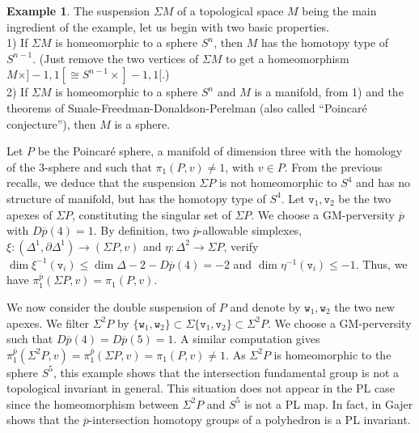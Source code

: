 \documentclass[a4paper,10pt,english,reqno]{amsart}
\theoremstyle{plain}
\theoremstyle{definition}
\newtheorem{example}[proposition]{Example}
\theoremstyle{remark}
\numberwithin{equation}{section}
\def\ov{\overline}
\def\tv{{\mathtt v}}
\def\tw{{\mathtt w}}
\renewcommand\1{\hbox{\ding{192}}}
\renewcommand\2{\hbox{\ding{193}}}
\newcommand\3{\hbox{\ding{194}}}
\newcommand\4{\hbox{\ding{195}}}
\begin{document}
\begin{example}\label{ex:poincaresphere}
 The suspension $\Sigma M$ of a topological space $M$ being the main ingredient of the example, let us begin with
 two basic properties.\\
 1) If $\Sigma M$ is homeomorphic to a sphere $S^n$, then $M$ has the homotopy type of
 $S^{n-1}$. (Just remove the two vertices of $\Sigma M$ to get a homeomorphism
 $M\times ]-1,1[\cong S^{n-1}\times ]-1,1[$.)\\
 2) If $\Sigma M$ is homeomorphic to a sphere $S^n$ and $M$ is a manifold, 
 from 1) and the theorems of 
 Smale-Freedman-Donaldson-Perelman (also called ``Poincar\'e conjecture''), then $M$ is a sphere.
 
Let $P$ be the Poincar\'e sphere, a manifold of dimension three with the homology of the 3-sphere and such that 
$\pi_{1}(P,v)\neq 1$, with $v\in P$.
From the previous recalls, we deduce that the suspension $\Sigma P$ is not homeomorphic to $S^4$
and has  no structure of manifold,  but
has the homotopy type of $S^4$.
Let  $\tv_{1},\tv_{2}$ be  the two apexes of  $\Sigma P$, constituting the singular set of $\Sigma P$.
We choose a GM-perversity $\ov{p}$ with $D\ov{p}(4)=1 $. 
By definition,  two $\ov{p}$-allowable simplexes,
$\xi\colon (\Delta^1,\partial \Delta^1)\to (\Sigma P,v)$ and $\eta\colon \Delta^2\to \Sigma P$,
  verify
$\dim\xi^{-1}(\tv_{i})\leq \dim \Delta-2-D\ov{p}(4)=-2$
and $\dim\eta^{-1}(\tv_{i})\leq -1$. Thus, we have $\pi_{1}^{\ov{p}}(\Sigma P,v)=\pi_{1}(P,v)$.

We now consider the double suspension  of $P$ and denote by $\tw_{1},\tw_{2}$ the two new apexes.
We filter $\Sigma^2 P$ by 
%
$\{\tw_{1},\tw_{2}\}\subset \Sigma\{\tv_{1}, \tv_{2}\}\subset \Sigma^2 P$.
%
%
We choose a GM-perversity such that  $D\ov{p}(4)= D\ov{p}(5)=1$. 
A similar computation gives $\pi_{1}^{\ov{p}}(\Sigma^2 P,v)=\pi_{1}^{\ov{p}}(\Sigma P,v)=\pi_{1}(P,v)\neq 1$.
As $\Sigma^2 P$ is homeomorphic to the sphere $S^5$, this example shows that the intersection fundamental group is not a
topological invariant in general.
This situation does not appear in the PL case since the homeomorphism between $\Sigma^2 P$ and $S^5$
is not a PL map. 
In fact, in \cite[Theorem 2.7]{MR1404919} Gajer shows that the $\ov{p}$-intersection homotopy groups of a polyhedron is a PL invariant.
%
%
\end{example}
\end{document}
